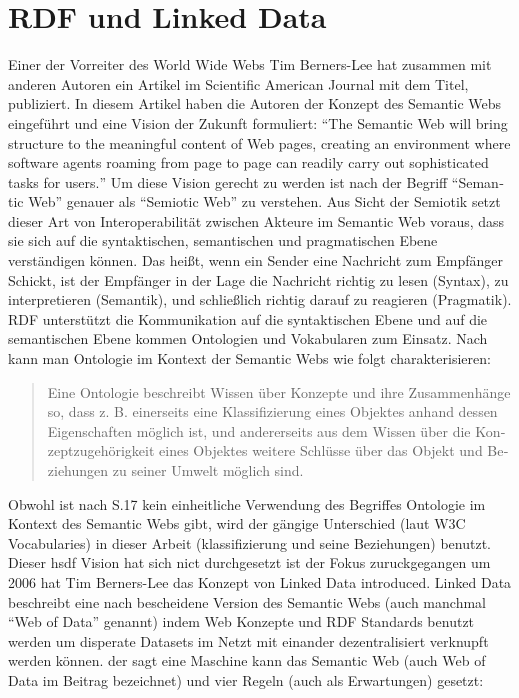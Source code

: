 \section{RDF und Linked Data}
\label{sec:linked-data}

Einer der Vorreiter des World Wide Webs Tim Berners-Lee hat zusammen mit anderen Autoren \citeyear{berners2001semantic} ein Artikel im Scientific American Journal mit dem Titel,  publiziert. In diesem Artikel haben die Autoren der Konzept des Semantic Webs eingeführt und eine Vision der Zukunft formuliert: \hyphenquote{german}{The Semantic Web will bring structure to the meaningful content of Web pages, creating an environment where software agents roaming from page to page can readily carry out sophisticated tasks for users.} Um diese Vision gerecht zu werden ist nach \citeauthor{blumauer2006semantic} der Begriff \hyphenquote{german}{Semantic Web} genauer als \hyphenquote{german}{Semiotic Web} zu verstehen. Aus Sicht der Semiotik setzt dieser Art von Interoperabilität zwischen Akteure im Semantic Web voraus, dass sie sich auf die syntaktischen, semantischen und pragmatischen Ebene verständigen können. Das heißt, wenn ein Sender eine Nachricht zum Empfänger Schickt, ist der Empfänger in der Lage die Nachricht richtig zu lesen (Syntax), zu interpretieren (Semantik), und schließlich richtig darauf zu reagieren (Pragmatik)\parencite[vgl.]{voigtmann2002enterprise}. RDF unterstützt die Kommunikation auf die syntaktischen Ebene und auf die semantischen Ebene kommen Ontologien und Vokabularen zum Einsatz. Nach \citeauthor[S.~488]{may2006semantic} kann man Ontologie im Kontext der Semantic Webs wie folgt charakterisieren: \hyphenblockquote{german}{Eine Ontologie beschreibt Wissen über Konzepte und ihre Zusammenhänge so, dass z. B. einerseits eine Klassifizierung eines Objektes anhand dessen Eigenschaften möglich ist, und andererseits aus dem Wissen über die Konzeptzugehörigkeit eines Objektes weitere Schlüsse über das Objekt und Beziehungen zu seiner Umwelt möglich sind.} Obwohl ist nach S.17 kein einheitliche Verwendung des Begriffes Ontologie im Kontext des Semantic Webs gibt, wird der gängige Unterschied (laut W3C Vocabularies) in dieser Arbeit (klassifizierung und seine Beziehungen) benutzt. Dieser hsdf Vision hat sich nict durchgesetzt ist der Fokus zuruckgegangen um 2006 hat Tim Berners-Lee das Konzept von Linked Data introduced. Linked Data beschreibt eine nach \citeauthor[S.~61]{dewilde2015information} bescheidene Version des Semantic Webs (auch manchmal \hyphenquote{german}{Web of Data} genannt) indem Web Konzepte und RDF Standards benutzt werden um disperate Datasets im Netzt mit einander dezentralisiert verknupft werden können.  der sagt eine Maschine kann das Semantic Web (auch Web of Data im Beitrag bezeichnet) und vier Regeln (auch als Erwartungen) gesetzt: 

